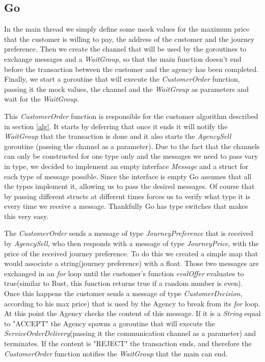 \documentclass[runningheads]{llncs}
\begin{document}
\subsection{Go}
In the main thread we simply define some mock values for the maximum price that the customer is willing to pay, the address of the customer and the journey preference. Then we create the channel that will be used by the goroutines to exchange messages and a {\it WaitGroup}, so that the main function doesn't end before the transaction between the customer and the agency has been completed. Finally, we start a goroutine that will execute the {\it CustomerOrder} function, passing it the mock values, the channel and the {\it WaitGroup} as parameters and wait for the {\it WaitGroup}.

This {\it CustomerOrder} function is responsible for the customer algorithm described in section \ref{alg}. It starts by deferring that once it ends it will notify the {\it WaitGroup} that the transaction is done and it also starts the {\it AgencySell} goroutine (passing the channel as a parameter).
Due to the fact that the channels can only be constructed for one type only and the messages we need to pass vary in type, we decided to implement an empty interface {\it Message} and a struct for each type  of message possible. Since the interface is empty Go assumes that all the types implement it, allowing us to pass the desired messages. Of course that by passing different structs at different times forces us to verify what type it is every time we receive a message. Thankfully Go has type switches that makes this very easy.

The {\it CustomerOrder} sends a message of type {\it JourneyPreference} that is received by {\it AgencySell}, who then responds with a message of type {\it JourneyPrice}, with the price of the received journey preference. To do this we created a simple map that would associate a string(journey preference) with a float. Those two messages are exchanged in an {\it for} loop until the customer's function {\it evalOffer} evaluates to true(similar to Rust, this function returns true if a random number is even). Once this happens the customer sends a message of type {\it CustomerDecision}, according to his max price) that is used by the Agency to break from its {\it for} loop. At this point the Agency checks the content of this message. If it is a {\it String} equal to "ACCEPT" the Agency spawns a goroutine that will execute the {\it ServiceOrderDelivery}(passing it the communication channel as a parameter) and terminates. If the content is "REJECT" the transaction ends, and therefore the {\it CustomerOrder} function notifies the {\it WaitGroup} that the main can end.
\end{document}
